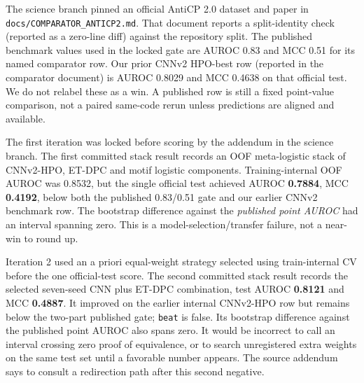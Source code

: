 

The science branch pinned an official AntiCP 2.0 dataset and paper in \texttt{docs/COMPARATOR\_ANTICP2.md}. That document reports a split-identity check (reported as a zero-line diff) against the repository split. The published benchmark values used in the locked gate are AUROC 0.83 and MCC 0.51 for its named comparator row. Our prior CNNv2 HPO-best row (reported in the comparator document) is AUROC 0.8029 and MCC 0.4638 on that official test. We do not relabel these as a win. A published row is still a fixed point-value comparison, not a paired same-code rerun unless predictions are aligned and available.


The first iteration was locked before scoring by the addendum in the science branch. The first committed stack result records an OOF meta-logistic stack of CNNv2-HPO, ET-DPC and motif logistic components. Training-internal OOF AUROC was 0.8532, but the single official test achieved AUROC \textbf{0.7884}, MCC \textbf{0.4192}, below both the published 0.83/0.51 gate and our earlier CNNv2 benchmark row. The bootstrap difference against the \emph{published point AUROC} had an interval spanning zero. This is a model-selection/transfer failure, not a near-win to round up.

Iteration 2 used an a priori equal-weight strategy selected using train-internal CV before the one official-test score. The second committed stack result records the selected seven-seed CNN plus ET-DPC combination, test AUROC \textbf{0.8121} and MCC \textbf{0.4887}. It improved on the earlier internal CNNv2-HPO row but remains below the two-part published gate; \texttt{beat} is false. Its bootstrap difference against the published point AUROC also spans zero. It would be incorrect to call an interval crossing zero proof of equivalence, or to search unregistered extra weights on the same test set until a favorable number appears. The source addendum says to consult a redirection path after this second negative.

